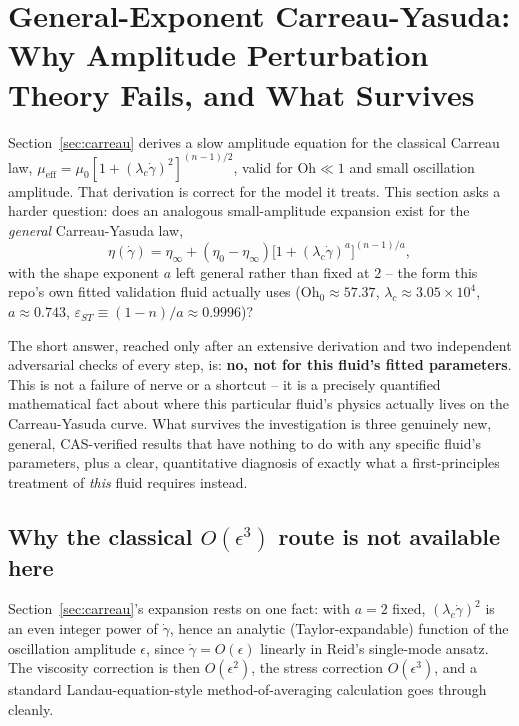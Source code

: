 \section{General-Exponent Carreau-Yasuda: Why Amplitude Perturbation Theory
         Fails, and What Survives}
\label{sec:cy_firstprinciples}

Section~\ref{sec:carreau} derives a slow amplitude equation for the classical
Carreau law, $\mu_{\mathrm{eff}}=\mu_0[1+(\lambda_c\dot\gamma)^2]^{(n-1)/2}$,
valid for $\mathrm{Oh}\ll 1$ and small oscillation amplitude. That derivation
is correct for the model it treats. This section asks a harder question:
does an analogous small-amplitude expansion exist for the \emph{general}
Carreau-Yasuda law,
\begin{equation}
  \eta(\dot\gamma) = \eta_\infty + (\eta_0-\eta_\infty)\bigl[1+(\lambda_c\dot\gamma)^a\bigr]^{(n-1)/a},
  \label{eq:cy_general}
\end{equation}
with the shape exponent $a$ left general rather than fixed at $2$ -- the form
this repo's own fitted validation fluid actually uses
($\mathrm{Oh}_0\approx 57.37$, $\lambda_c\approx 3.05\times 10^4$,
$a\approx 0.743$, $\varepsilon_{ST}\equiv(1-n)/a\approx 0.9996$)?

The short answer, reached only after an extensive derivation and two
independent adversarial checks of every step, is: \textbf{no, not for this
fluid's fitted parameters}. This is not a failure of nerve or a shortcut --
it is a precisely quantified mathematical fact about where this particular
fluid's physics actually lives on the Carreau-Yasuda curve. What survives
the investigation is three genuinely new, general, CAS-verified results that
have nothing to do with any specific fluid's parameters, plus a clear,
quantitative diagnosis of exactly what a first-principles treatment of
\emph{this} fluid requires instead.

\subsection{Why the classical $O(\epsilon^3)$ route is not available here}
\label{sec:cy_why_not_epsilon3}

Section~\ref{sec:carreau}'s expansion rests on one fact: with $a=2$ fixed,
$(\lambda_c\dot\gamma)^2$ is an even integer power of $\dot\gamma$, hence an
analytic (Taylor-expandable) function of the oscillation amplitude
$\epsilon$, since $\dot\gamma=O(\epsilon)$ linearly in Reid's single-mode
ansatz. The viscosity correction is then $O(\epsilon^2)$, the stress
correction $O(\epsilon^3)$, and a standard Landau-equation-style
method-of-averaging calculation goes through cleanly.


